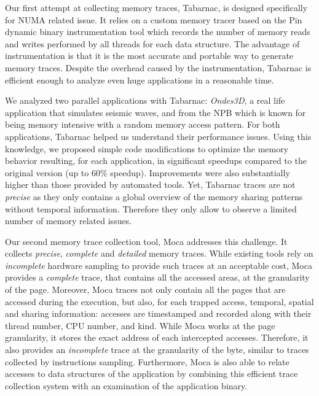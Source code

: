 Our first attempt at collecting memory traces, \gls{Tabarnac}, is designed specifically for \gls{NUMA} related issue.
It relies on a custom memory tracer based on the Pin dynamic binary instrumentation tool which records the number of memory reads and writes performed by all threads for each data structure.
The advantage of instrumentation is that it is the most accurate and portable way to generate memory traces.
Despite the overhead caused by the instrumentation, \gls{Tabarnac} is efficient enough to analyze even huge applications in a reasonable time.

We analyzed two parallel applications with \gls{Tabarnac}: \emph{Ondes3D}, a real life application that
simulates seismic waves, and \IS from the \gls{NPB} which is known for being memory intensive with a random memory access pattern.
For both applications, \gls{Tabarnac} helped us understand their performance issues.
Using this knowledge, we proposed simple code modifications to optimize the memory behavior resulting, for each application, in significant speedups compared to the original version (up to $60\%$ speedup).
Improvements were also substantially higher than those provided by automated tools.
Yet, \gls{Tabarnac} traces are not \emph{precise} as they only contains a global overview of the memory sharing patterns without temporal information.
Therefore they only allow to observe a limited number of memory related issues.

Our second memory trace collection tool, \gls{Moca} addresses this challenge.
It  collects \emph{precise}, \emph{complete} and \emph{detailed} memory traces.
While existing tools rely on \emph{incomplete} hardware sampling to provide such traces at an acceptable cost, \gls{Moca} provides a \emph{complete} trace, that contains all the accessed areas, at the granularity of the page.
Moreover, \gls{Moca} traces not only contain all the pages that are accessed during the execution, but also, for each trapped access, temporal, spatial and sharing information: accesses are timestamped and recorded along with their thread number, CPU number, and kind.
While \gls{Moca} works at the page granularity, it stores the exact address of each intercepted accesses.
Therefore, it also provides an \emph{incomplete} trace at the granularity of the byte, similar to traces collected by instructions sampling.
Furthermore, \gls{Moca} is also able to relate accesses to data structures of the application by combining this efficient trace collection system with an examination of the application binary.

